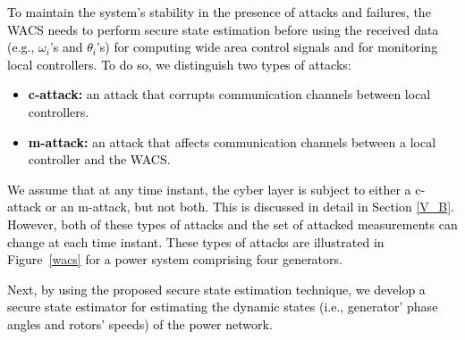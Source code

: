 \textcolor{black}{To maintain the system's stability in the presence of attacks and failures, the WACS needs to perform secure state estimation before using the received data (e.g., $\omega_i$'s and $\theta_i$'s) for computing wide area control signals and for monitoring local controllers. To do so, we distinguish two types of attacks:
\begin{itemize}
\item \textbf{c-attack:} an attack that corrupts communication channels between local controllers.
\item \textbf{m-attack:} an attack that affects communication channels between a local controller and the WACS. %
\end{itemize}
We assume that at any time instant, the cyber layer is subject to either a c-attack or an m-attack, but not both. This is discussed in detail in Section \ref{V_B}. However, both of these types of attacks and the set of attacked measurements can change at each time instant. These types of attacks are illustrated in Figure~\ref{wacs} for a power system comprising four generators.}



\textcolor{black}{Next, by using the proposed secure state estimation technique, we develop a secure state estimator for estimating the dynamic states (i.e., generator' phase angles and rotors' speeds) of the power network.}


